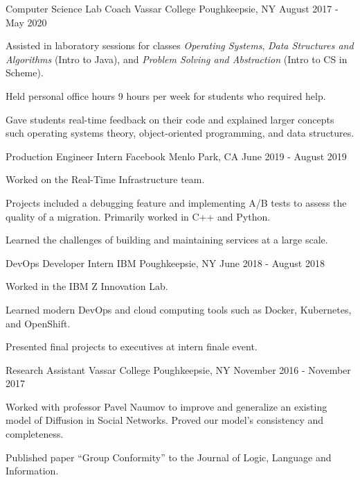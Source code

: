 \begin{cventries}
   \cventry
    {Computer Science Lab Coach}
    {Vassar College}
    {Poughkeepsie, NY}
    {August 2017 - May 2020}
    {
        \begin{cvitems}
        \item {Assisted in laboratory sessions for classes \textit{Operating Systems}, \textit{Data Structures and Algorithms} (Intro to Java), and \textit{Problem Solving and Abstraction} (Intro to CS in Scheme).}        
        \item {Held personal office hours 9 hours per week for students who required help.}
        \item {Gave students real-time feedback on their code and explained larger concepts such operating systems theory, object-oriented programming, and data structures.}
        \end{cvitems}
    }
  \cventry
    {Production Engineer Intern} %
    {Facebook} %
    {Menlo Park, CA} %
    {June 2019 - August 2019} %
    {
      \begin{cvitems} %
      \item {Worked on the Real-Time Infrastructure team.}
      \item {Projects included a debugging feature and implementing A/B tests to assess the quality of a migration. Primarily worked in C++ and Python.} 
      \item {Learned the challenges of building and maintaining services at a large scale.}
      \end{cvitems}
    }

  \cventry
    {DevOps Developer Intern} %
    {IBM} %
    {Poughkeepsie, NY} %
    {June 2018 - August 2018} %
    {
      \begin{cvitems} %
      \item {Worked in the IBM Z Innovation Lab.}
        \item {Learned modern DevOps and cloud computing tools such as Docker, Kubernetes, and OpenShift.}
        \item {Presented final projects to executives at intern finale event.}
      \end{cvitems}
    }

    \cventry
    {Research Assistant}
    {Vassar College}
    {Poughkeepsie, NY}
    {November 2016 - November 2017}
    {
        \begin{cvitems}
        \item{Worked with professor Pavel Naumov to improve and generalize an existing model of Diffusion in Social Networks. Proved our model’s consistency and completeness.}
        \item{Published paper “Group Conformity” to the Journal of Logic, Language and Information.} 
        \end{cvitems}
        }

\end{cventries}

